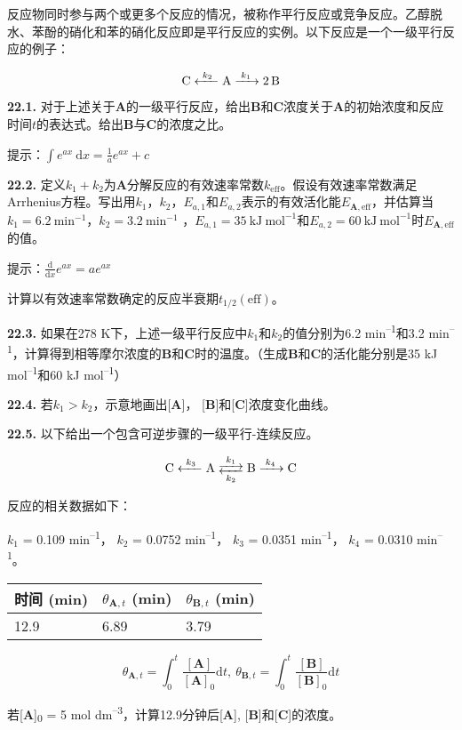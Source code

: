 反应物同时参与两个或更多个反应的情况，被称作平行反应或竞争反应。乙醇脱水、苯酚的硝化和苯的硝化反应即是平行反应的实例。以下反应是一个一级平行反应的例子：

$$\ce{C <-[$k_2$] A ->[$k_1$] 2B}$$

\noindent\textbf{22.1.}
对于上述关于\textbf{A}的一级平行反应，给出\textbf{B}和\textbf{C}浓度关于\textbf{A}的初始浓度和反应时间$t$的表达式。给出\textbf{B}与\textbf{C}的浓度之比。

\noindent 提示：$\int e^{ax}\ \mathrm d x=\frac{1}{a}e^{ax}+c$

\noindent\textbf{22.2.}
定义$k_1+k_2$为\textbf{A}分解反应的有效速率常数$k_{\mathrm{eff}}$。假设有效速率常数满足Arrhenius方程。写出用$k_1$，$k_2$，$E_{a,1}$和$E_{a,2}$表示的有效活化能$E_{\mathbf A,\mathrm{eff}}$，并估算当$k_1=6.2\ \mathrm{min^{-1}}$，$k_2=3.2\ \mathrm{min^{-1}}$ ，$E_{a,1}=35\ \mathrm{kJ\ mol^{-1}}$和$E_{a,2}=60\ \mathrm{kJ\ mol^{-1}}$时$E_{\mathbf A,\mathrm{eff}}$的值。

\noindent 提示：$\frac{\mathrm d}{\mathrm dx}e^{ax}=ae^{ax}$

计算以有效速率常数确定的反应半衰期$t_{1/2}(\mathrm{eff})$。

\noindent\textbf{22.3.} 如果在278 K下，上述一级平行反应中$k_1$和$k_2$的值分别为6.2 min\textsuperscript{--1}和3.2 min\textsuperscript{--1}，计算得到相等摩尔浓度的\textbf{B}和\textbf{C}时的温度。（生成\textbf{B}和\textbf{C}的活化能分别是35 kJ mol\textsuperscript{--1}和60 kJ mol\textsuperscript{--1}）

\noindent\textbf{22.4.} 若$k_1>k_2$，示意地画出{[}\textbf{A}{]}，
{[}\textbf{B}{]}和{[}\textbf{C}{]}浓度变化曲线。

\noindent\textbf{22.5.} 以下给出一个包含可逆步骤的一级平行-连续反应。

$$\ce{C <-[$k_3$] A <-->[$k_1$][$k_2$] B ->[$k_4$] C}$$

反应的相关数据如下：

$k_1$ = 0.109 min\textsuperscript{--1}，
$k_2$ = 0.0752 min\textsuperscript{--1}，
$k_3$ = 0.0351 min\textsuperscript{--1}，
$k_4$ = 0.0310 min\textsuperscript{--1}。

\begin{longtable}[]{@{}lll@{}}
\toprule
时间 (min) & $\theta_{\mathbf{A},t}$ (min) &
$\theta_{\mathbf{B},t}$ (min)\tabularnewline
\midrule
\endhead
12.9 & 6.89 & 3.79\tabularnewline
\bottomrule
\end{longtable}

$$\theta_{\mathbf{A},t}=\int_0^t\frac{[\mathbf A]}{[\mathbf A]_0}\mathrm dt,\ \theta_{\mathbf{B},t}=\int_0^t\frac{[\mathbf B]}{[\mathbf B]_0}\mathrm dt$$

若{[}\textbf{A}{]}\textsubscript{0} = 5 mol
dm\textsuperscript{--3}，计算12.9分钟后{[}\textbf{A}{]},
{[}\textbf{B}{]}和{[}\textbf{C}{]}的浓度。
